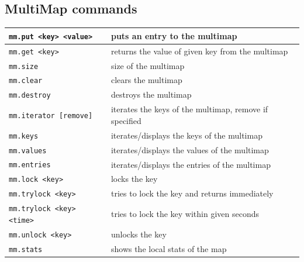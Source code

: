 \subsection*{MultiMap commands}
\begin{tabular}{|p{4cm}|p{9cm}|}
    \hline
    \texttt{mm.put <key> <value>} & puts an entry to the multimap\\\hline
    \texttt{mm.get <key>} & returns the value of given key from the multimap\\\hline
    \texttt{mm.size} & size of the multimap\\\hline
    \texttt{mm.clear} & clears the multimap\\\hline
    \texttt{mm.destroy} & destroys the multimap\\\hline
    \texttt{mm.iterator [remove]} & iterates the keys of the multimap, remove if specified\\\hline
    \texttt{mm.keys} & iterates/displays the keys of the multimap\\\hline
    \texttt{mm.values} & iterates/displays the values of the multimap\\\hline
    \texttt{mm.entries} & iterates/displays the entries of the multimap\\\hline
    \texttt{mm.lock <key>} & locks the key\\\hline
    \texttt{mm.trylock <key>} & tries to lock the key and returns immediately\\\hline
    \texttt{mm.trylock <key> <time>} & tries to lock the key within given seconds\\\hline
    \texttt{mm.unlock <key>} & unlocks the key\\\hline
    \texttt{mm.stats} & shows the local stats of the map\\\hline    
\end{tabular}

